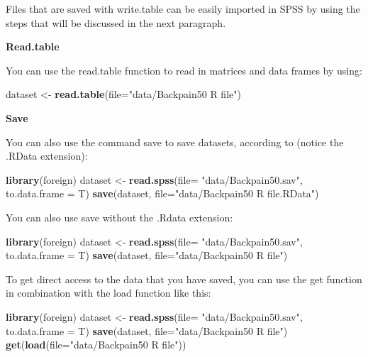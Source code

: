 \documentclass[]{book}
\newenvironment{Shaded}{\begin{snugshade}}{\end{snugshade}}
\newcommand{\KeywordTok}[1]{\textcolor[rgb]{0.13,0.29,0.53}{\textbf{#1}}}
\newcommand{\DataTypeTok}[1]{\textcolor[rgb]{0.13,0.29,0.53}{#1}}
\newcommand{\StringTok}[1]{\textcolor[rgb]{0.31,0.60,0.02}{#1}}
\newcommand{\NormalTok}[1]{#1}
\begin{document}
Files that are saved with write.table can be easily imported in SPSS by
using the steps that will be discussed in the next paragraph.

\textbf{Read.table}

You can use the read.table function to read in matrices and data frames
by using:

\begin{Shaded}
\begin{Highlighting}[]
\NormalTok{dataset <-}\StringTok{ }\KeywordTok{read.table}\NormalTok{(}\DataTypeTok{file=}\StringTok{"data/Backpain50 R file"}\NormalTok{)}
\end{Highlighting}
\end{Shaded}

\textbf{Save}

You can also use the command save to save datasets, according to (notice
the .RData extension):

\begin{Shaded}
\begin{Highlighting}[]
\KeywordTok{library}\NormalTok{(foreign)}
\NormalTok{dataset <-}\StringTok{ }\KeywordTok{read.spss}\NormalTok{(}\DataTypeTok{file=} \StringTok{"data/Backpain50.sav"}\NormalTok{, }\DataTypeTok{to.data.frame =}\NormalTok{ T)}
\KeywordTok{save}\NormalTok{(dataset, }\DataTypeTok{file=}\StringTok{"data/Backpain50 R file.RData"}\NormalTok{)}
\end{Highlighting}
\end{Shaded}

You can also use save without the .Rdata extension:

\begin{Shaded}
\begin{Highlighting}[]
\KeywordTok{library}\NormalTok{(foreign)}
\NormalTok{dataset <-}\StringTok{ }\KeywordTok{read.spss}\NormalTok{(}\DataTypeTok{file=} \StringTok{"data/Backpain50.sav"}\NormalTok{, }\DataTypeTok{to.data.frame =}\NormalTok{ T)}
\KeywordTok{save}\NormalTok{(dataset, }\DataTypeTok{file=}\StringTok{"data/Backpain50 R file"}\NormalTok{)}
\end{Highlighting}
\end{Shaded}

To get direct access to the data that you have saved, you can use the
get function in combination with the load function like this:

\begin{Shaded}
\begin{Highlighting}[]
\KeywordTok{library}\NormalTok{(foreign)}
\NormalTok{dataset <-}\StringTok{ }\KeywordTok{read.spss}\NormalTok{(}\DataTypeTok{file=} \StringTok{"data/Backpain50.sav"}\NormalTok{, }\DataTypeTok{to.data.frame =}\NormalTok{ T)}
\KeywordTok{save}\NormalTok{(dataset, }\DataTypeTok{file=}\StringTok{"data/Backpain50 R file"}\NormalTok{)}
\KeywordTok{get}\NormalTok{(}\KeywordTok{load}\NormalTok{(}\DataTypeTok{file=}\StringTok{"data/Backpain50 R file"}\NormalTok{))}
\end{Highlighting}
\end{Shaded}
\end{document}
